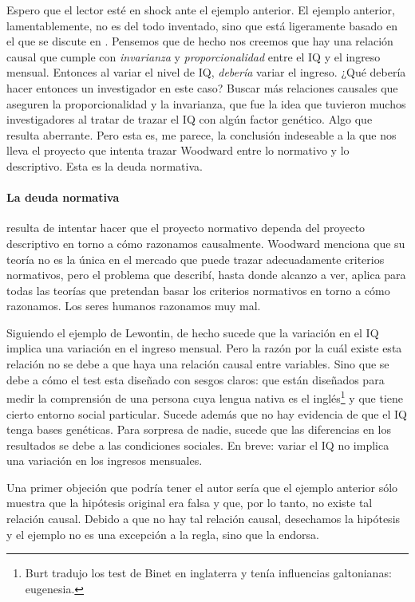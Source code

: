 Espero que el lector esté en shock ante el ejemplo anterior.
El ejemplo anterior, lamentablemente, no es del todo
inventado, sino que está ligeramente basado en el que se
discute en \parencite{Lewontin2017}. Pensemos que de hecho
nos creemos que hay una relación causal que cumple con
\emph{invarianza} y \emph{proporcionalidad} entre el IQ y el
ingreso mensual. Entonces al variar el nivel de IQ,
\emph{debería} variar el ingreso. ¿Qué debería hacer
entonces un investigador en este caso? Buscar más relaciones
causales que aseguren la proporcionalidad y la invarianza,
que fue la idea que tuvieron muchos investigadores al tratar
de trazar el IQ con algún factor genético. Algo que resulta
aberrante. Pero esta es, me parece, la conclusión indeseable
a la que nos lleva el proyecto que intenta trazar Woodward
entre lo normativo y lo descriptivo. Esta es la deuda
normativa.


\paragraph{La deuda normativa} resulta de intentar hacer que
el proyecto normativo dependa del proyecto descriptivo en
torno a cómo razonamos causalmente. Woodward menciona que su
teoría no es la única en el mercado que puede trazar
adecuadamente criterios normativos, pero el problema que
describí, hasta donde alcanzo a ver, aplica para todas las
teorías que pretendan basar los criterios normativos en
torno a cómo razonamos. Los seres humanos razonamos muy mal. 

Siguiendo el ejemplo de Lewontin, de hecho sucede que la
variación en el IQ implica una variación en el ingreso
mensual. Pero la razón por la cuál existe esta relación no
se debe a que haya una relación causal entre variables. Sino
que se debe a cómo el test esta diseñado con sesgos claros:
que están diseñados para medir la comprensión de una persona
cuya lengua nativa es el inglés\footnote{ 
  Burt tradujo los test de Binet en inglaterra y tenía
  influencias galtonianas: eugenesia.
} 
y que tiene cierto entorno social particular. Sucede además
que no hay evidencia de que el IQ tenga bases genéticas.
Para sorpresa de nadie, sucede que las diferencias en los 
resultados se debe a las condiciones sociales. En
breve: variar el IQ no implica una variación en los ingresos
mensuales. 

Una primer objeción que podría tener el autor sería que el
ejemplo anterior sólo muestra que la hipótesis original era
falsa y que, por lo tanto, no existe tal relación causal.
Debido a que no hay tal relación causal, desechamos la
hipótesis y el ejemplo no es una excepción a la regla, sino
que la endorsa.


